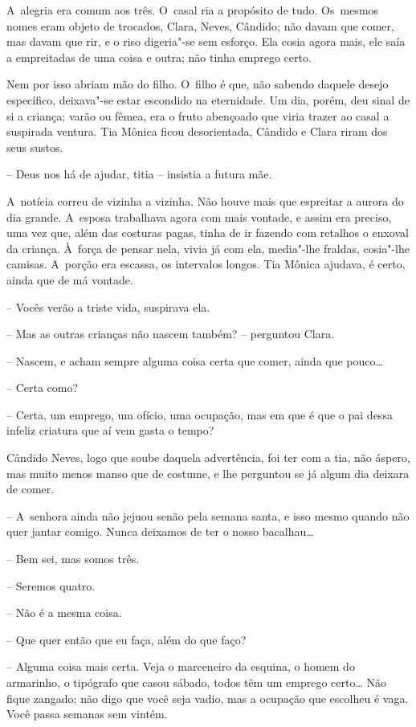 A~alegria era comum aos três. O~casal ria a propósito de tudo. Os~mesmos
nomes eram objeto de trocados, Clara, Neves, Cândido; não davam que
comer, mas davam que rir, e o riso digeria"-se sem esforço. Ela cosia
agora mais, ele saía a empreitadas de uma coisa e outra; não tinha
emprego certo.

Nem por isso abriam mão do filho. O~filho é que, não sabendo daquele
desejo específico, deixava"-se estar escondido na eternidade. Um dia,
porém, deu sinal de si a criança; varão ou fêmea, era o fruto abençoado
que viria trazer ao casal a suspirada ventura. Tia Mônica ficou
desorientada, Cândido e Clara riram dos seus sustos.

-- Deus nos há de ajudar, titia -- insistia a futura mãe.

A~notícia correu de vizinha a vizinha. Não houve mais que espreitar a
aurora do dia grande. A~esposa trabalhava agora com mais vontade, e
assim era preciso, uma vez que, além das costuras pagas, tinha de ir
fazendo com retalhos o enxoval da criança. À~força de pensar nela, vivia
já com ela, media"-lhe fraldas, cosia"-lhe camisas. A~porção era escassa,
os intervalos longos. Tia Mônica ajudava, é certo, ainda que de má
vontade.

-- Vocês verão a triste vida, suspirava ela.

-- Mas as outras crianças não nascem também? -- perguntou Clara.

-- Nascem, e acham sempre alguma coisa certa que comer, ainda que
pouco\ldots{}

-- Certa como?

-- Certa, um emprego, um ofício, uma ocupação, mas em que é que o pai
dessa infeliz criatura que aí vem gasta o tempo?

Cândido Neves, logo que soube daquela advertência, foi ter com a tia,
não áspero, mas muito menos manso que de costume, e lhe perguntou se já
algum dia deixara de comer.

-- A~senhora ainda não jejuou senão pela semana santa, e isso mesmo
quando não quer jantar comigo. Nunca deixamos de ter o nosso bacalhau\ldots{}

-- Bem sei, mas somos três.

-- Seremos quatro.

-- Não é a mesma coisa.

-- Que quer então que eu faça, além do que faço?

-- Alguma coisa mais certa. Veja o marceneiro da esquina, o homem do
armarinho, o tipógrafo que casou sábado, todos têm um emprego certo\ldots{}
Não fique zangado; não digo que você seja vadio, mas a ocupação que
escolheu é vaga. Você passa semanas sem vintém.

